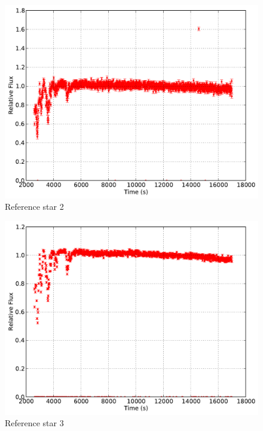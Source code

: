\documentclass{aastex61}
\begin{document}
\begin{figure}[hbt!]
	\centering
	\includegraphics[scale = .30]{exo_curves2.pdf}
	\caption{Reference star 2}
	\label{fig: refcurve2}
\end{figure}
\begin{figure}[h]
	\centering
	\includegraphics[scale = .30]{exo_curves3.pdf}
	\caption{Reference star 3}
	\label{fig: refcurve3}
\end{figure}
\end{document}
